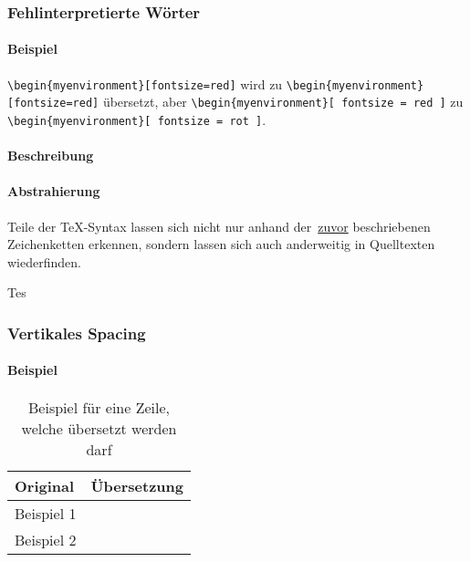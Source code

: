 \subsubsection{Fehlinterpretierte Wörter}\label{problems:misunderstoodWords}%
\paragraph*{Beispiel}
\verb|\begin{myenvironment}[fontsize=red]| wird zu \verb|\begin{myenvironment}[fontsize=red]| übersetzt, aber \verb|\begin{myenvironment}[ fontsize = red ]| zu \verb|\begin{myenvironment}[ fontsize = rot ]|.
\paragraph*{Beschreibung}
\paragraph*{Abstrahierung}
Teile der \TeX-Syntax lassen sich nicht nur anhand der~\hyperref[problems:unexpectedCharacters]{zuvor} beschriebenen Zeichenketten erkennen, sondern lassen sich auch anderweitig in Quelltexten wiederfinden.



Tes


\subsubsection{Vertikales Spacing}\label{problems:verticalSpacing}
\paragraph*{Beispiel}
\begin{table}[h!]
    \centering
    \begin{tabularx}{\textwidth}{X X}
        \toprule
            Original & Übersetzung\\
        \midrule
            Beispiel 1 & \\[2em]
            Beispiel 2 & \\
        \bottomrule
    \end{tabularx}
    \caption{Beispiel für eine Zeile, welche übersetzt werden darf}\label{tab:problems:verticalSpacing}
\end{table}

